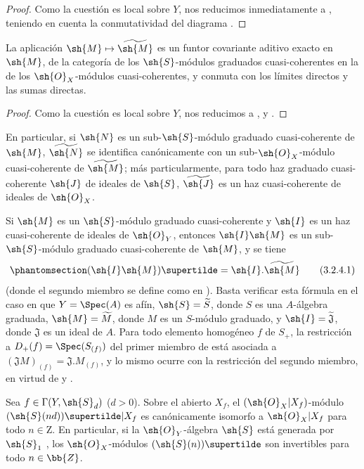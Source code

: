 \documentclass[oneside,10pt]{amsart}
\makeatletter
\newcommand{\ega@arrow}[2]{\mathchoice{#1}{#2}{#2}{#2}}
\let\ega@shortmapsto\mapsto
\renewcommand{\mapsto}{\ega@arrow{\longmapsto}{\ega@shortmapsto}}
\newcommand{\oldpage}[2][]{\marginnote{\normalfont\footnotesize\textbf{#1}~|~#2}\ignorespaces}
\let\EGAOriginalLabel\label
\renewcommand{\label}[1]{\phantomsection\EGAOriginalLabel{#1}}
\makeatother
\begin{document}
\begin{proof}
Como la cuestión es local sobre $Y$, nos reducimos inmediatamente a , teniendo en cuenta la conmutatividad del diagrama .
\end{proof}

\begin{proposition}[3.2.4]
\label{II.3.2.4}
La aplicación $\sh{M}\mapsto\widetilde{\sh{M}}$ es un funtor covariante aditivo exacto en $\sh{M}$, de la categoría de los $\sh{S}$-módulos graduados cuasi-coherentes en la de los $\sh{O}_X$-módulos cuasi-coherentes, y conmuta con los límites directos y las sumas directas.
\end{proposition}

\begin{proof}
Como la cuestión es local sobre $Y$, nos reducimos a ,  y .
\end{proof}

En particular, si $\sh{N}$ es un sub-$\sh{S}$-módulo graduado cuasi-coherente de $\sh{M}$, $\widetilde{\sh{N}}$ se identifica canónicamente con un sub-$\sh{O}_X$-módulo cuasi-coherente de $\widetilde{\sh{M}}$; más particularmente, para todo haz graduado cuasi-coherente $\sh{J}$ de ideales de $\sh{S}$, $\widetilde{\sh{J}}$ es un haz cuasi-coherente de ideales de $\sh{O}_X$.

Si $\sh{M}$ es un $\sh{S}$-módulo graduado cuasi-coherente y $\sh{I}$ es un haz cuasi-coherente de ideales de $\sh{O}_Y$, entonces $\sh{I}\sh{M}$ es un sub-$\sh{S}$-módulo graduado cuasi-coherente de $\sh{M}$, y se tiene
\[
\label{II.3.2.4.1}
  (\sh{I}\sh{M})\supertilde=\sh{I}.\widetilde{\sh{M}}
\tag{3.2.4.1}
\]
(donde el segundo miembro se define como en ).
Basta verificar esta fórmula en el caso en que $Y=\Spec(A)$ es afín, $\sh{S}=\widetilde{S}$, donde $S$ es una $A$-álgebra graduada, $\sh{M}=\widetilde{M}$, donde $M$ es un $S$-módulo graduado, y $\sh{I}=\widetilde{\mathfrak{J}}$, donde $\mathfrak{J}$ es un ideal de $A$.
\oldpage[II]{55}
Para todo elemento homogéneo $f$ de $S_+$, la restricción a $D_+(f)=\Spec(S_{(f)})$ del primer miembro de  está asociada a $(\mathfrak{J}M)_{(f)}=\mathfrak{J}.M_{(f)}$, y lo mismo ocurre con la restricción del segundo miembro, en virtud de  y .

\begin{proposition}[3.2.5]
\label{II.3.2.5}
Sea $f\in\Gamma(Y,\sh{S}_d)$ ($d>0$).
Sobre el abierto $X_f$, el $(\sh{O}_X|X_f)$-módulo $(\sh{S}(nd))\supertilde|X_f$ es canónicamente isomorfo a $\sh{O}_X|X_f$ para todo $n\in\mathrm{Z}$.
En particular, si la $\sh{O}_Y$-álgebra $\sh{S}$ está generada por $\sh{S}_1$ , los $\sh{O}_X$-módulos $(\sh{S}(n))\supertilde$ son invertibles para todo $n\in\bb{Z}$.
\end{proposition}
\end{document}
